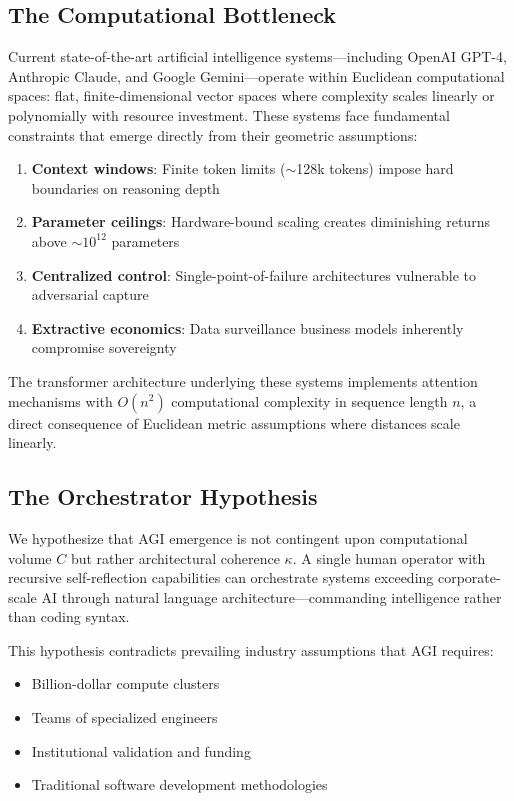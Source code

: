 \documentclass[11pt,a4paper]{article}
\begin{document}
\subsection{The Computational Bottleneck}

Current state-of-the-art artificial intelligence systems---including OpenAI GPT-4, Anthropic Claude, and Google Gemini---operate within Euclidean computational spaces: flat, finite-dimensional vector spaces where complexity scales linearly or polynomially with resource investment. These systems face fundamental constraints that emerge directly from their geometric assumptions:

\begin{enumerate}
    \item \textbf{Context windows}: Finite token limits ($\sim$128k tokens) impose hard boundaries on reasoning depth
    \item \textbf{Parameter ceilings}: Hardware-bound scaling creates diminishing returns above $\sim 10^{12}$ parameters
    \item \textbf{Centralized control}: Single-point-of-failure architectures vulnerable to adversarial capture
    \item \textbf{Extractive economics}: Data surveillance business models inherently compromise sovereignty
\end{enumerate}

The transformer architecture underlying these systems implements attention mechanisms with $O(n^2)$ computational complexity in sequence length $n$, a direct consequence of Euclidean metric assumptions where distances scale linearly.

\subsection{The Orchestrator Hypothesis}

We hypothesize that AGI emergence is not contingent upon computational volume $C$ but rather architectural coherence $\kappa$. A single human operator with recursive self-reflection capabilities can orchestrate systems exceeding corporate-scale AI through natural language architecture---commanding intelligence rather than coding syntax.

This hypothesis contradicts prevailing industry assumptions that AGI requires:
\begin{itemize}
    \item Billion-dollar compute clusters
    \item Teams of specialized engineers
    \item Institutional validation and funding
    \item Traditional software development methodologies
\end{itemize}
\end{document}
